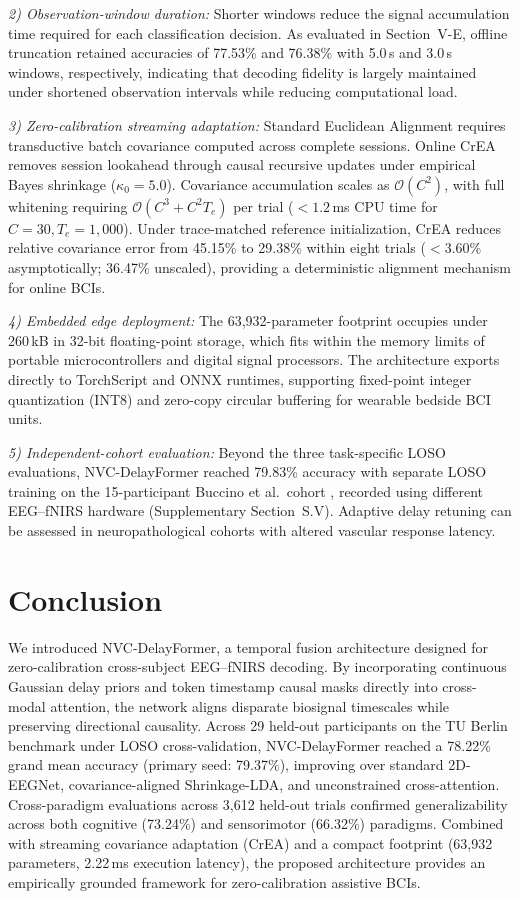 \documentclass[journal]{IEEEtran}
\begin{document}
\textit{2) Observation-window duration:} Shorter windows reduce the signal accumulation time required for each classification decision. As evaluated in Section~V-E, offline truncation retained accuracies of 77.53\% and 76.38\% with 5.0\,s and 3.0\,s windows, respectively, indicating that decoding fidelity is largely maintained under shortened observation intervals while reducing computational load.

\textit{3) Zero-calibration streaming adaptation:} Standard Euclidean Alignment requires transductive batch covariance computed across complete sessions. Online CrEA removes session lookahead through causal recursive updates under empirical Bayes shrinkage ($\kappa_0 = 5.0$). Covariance accumulation scales as $\mathcal{O}(C^2)$, with full whitening requiring $\mathcal{O}(C^3 + C^2 T_e)$ per trial ($<1.2$\,ms CPU time for $C=30, T_e=1,000$). Under trace-matched reference initialization, CrEA reduces relative covariance error from 45.15\% to 29.38\% within eight trials ($<3.60\%$ asymptotically; 36.47\% unscaled), providing a deterministic alignment mechanism for online BCIs.

\textit{4) Embedded edge deployment:} The 63,932-parameter footprint occupies under 260\,kB in 32-bit floating-point storage, which fits within the memory limits of portable microcontrollers and digital signal processors. The architecture exports directly to TorchScript and ONNX runtimes, supporting fixed-point integer quantization (INT8) and zero-copy circular buffering for wearable bedside BCI units.

\textit{5) Independent-cohort evaluation:} Beyond the three task-specific LOSO evaluations, NVC-DelayFormer reached 79.83\% accuracy with separate LOSO training on the 15-participant Buccino et al.\ cohort \cite{buccino2016hybrid}, recorded using different EEG--fNIRS hardware (Supplementary Section~S.V). Adaptive delay retuning can be assessed in neuropathological cohorts with altered vascular response latency.

\section{Conclusion}
\label{sec:conclusion}
We introduced NVC-DelayFormer, a temporal fusion architecture designed for zero-calibration cross-subject EEG--fNIRS decoding. By incorporating continuous Gaussian delay priors and token timestamp causal masks directly into cross-modal attention, the network aligns disparate biosignal timescales while preserving directional causality. Across 29 held-out participants on the TU Berlin benchmark under LOSO cross-validation, NVC-DelayFormer reached a 78.22\% grand mean accuracy (primary seed: 79.37\%), improving over standard 2D-EEGNet, covariance-aligned Shrinkage-LDA, and unconstrained cross-attention. Cross-paradigm evaluations across 3,612 held-out trials confirmed generalizability across both cognitive (73.24\%) and sensorimotor (66.32\%) paradigms. Combined with streaming covariance adaptation (CrEA) and a compact footprint (63,932 parameters, 2.22\,ms execution latency), the proposed architecture provides an empirically grounded framework for zero-calibration assistive BCIs.
\end{document}
